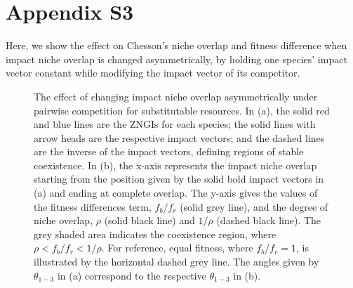 \clearpage
\section{Appendix S3}
Here, we show the effect on Chesson's niche overlap and fitness difference when impact niche overlap is changed asymmetrically, by holding one species' impact vector constant while modifying the impact vector of its competitor. 
\par


\begin{figure}[H]
	\centering
	\caption[The effect of changing impact niche overlap asymmetrically under pairwise competition for substitutable resources.]
		{\hspace{1mm}The effect of changing impact niche overlap asymmetrically under pairwise competition for substitutable resources. In (a), the solid red and blue lines are the ZNGIs for each species; the solid lines with arrow heads are the respective impact vectors; and the dashed lines are the inverse of the impact vectors, defining regions of stable coexistence. In (b), the x-axis represents the impact niche overlap starting from the position given by the solid bold impact vectors in (a) and ending at complete overlap. The y-axis gives the values of the fitness differences term, $f_{b}/f_{r}$ (solid grey line), and the degree of niche overlap, $\rho$ (solid black line) and $1/\rho$ (dashed black line). The grey shaded area indicates the coexistence region, where $\rho<f_{b}/f_{r}<1/\rho$. For reference, equal fitness, where $f_{b}/f_{r}=1$, is illustrated by the horizontal dashed grey line. The angles given by $\theta_{1-3}$ in (a) correspond to the respective $\theta_{1-3}$ in (b).}
	\label{fig:impact-appendix-fig-asymmetry}
\end{figure}



